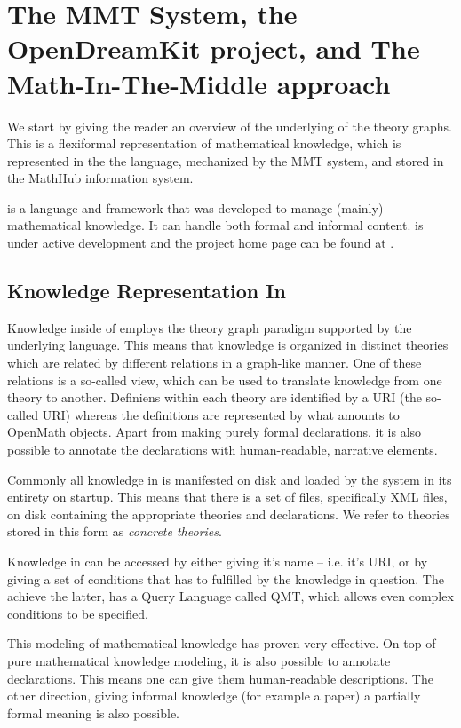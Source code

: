 \section{The MMT System, the OpenDreamKit project, and The Math-In-The-Middle approach}\label{sec:mmtmitm}

We start by giving the reader an overview of the underlying of the \ommt theory graphs. 
This is a flexiformal representation of mathematical knowledge, which is represented in the the \omdocmmt language, mechanized by the MMT system, and stored in the MathHub information system. 

\mmt \cite{Rabe:MMTLanguageSystem09} is a language and framework that was developed to manage (mainly) mathematical knowledge. 
It can handle both formal and informal content. 
\mmt is under active development and the project home page can be found at \cite{uniformal:on}. 

\subsection{Knowledge Representation In \omdocmmt}\label{sec:mmtmitm:kr}

Knowledge inside of \mmt employs the theory graph paradigm supported by the underlying \ommt language. 
This means that knowledge is organized in distinct theories which are related by different relations in a graph-like manner. 
One of these relations is a so-called view, which can be used to translate knowledge from one theory to another. 
Definiens within each theory are identified by a URI (the so-called \mmt URI) whereas the definitions are represented by what amounts to OpenMath \cite{BusCapCar:oms04} objects. 
Apart from making purely formal declarations, it is also possible to annotate the declarations with human-readable, narrative elements. 

Commonly all knowledge in \mmt is manifested on disk and loaded by the system in its entirety on startup. 
This means that there is a set of files, specifically XML files, on disk containing the appropriate theories and declarations. 
We refer to theories stored in this form as \textit{concrete theories}. 

Knowledge in \mmt can be accessed by either giving it's name -- i.e. it's \mmt URI, 
or by giving a set of conditions that has to fulfilled by the knowledge in question. 
The achieve the latter, \mmt has a Query Language called QMT, which allows even complex conditions to be specified. 

This modeling of mathematical knowledge has proven very effective. 
On top of pure mathematical knowledge modeling, it is also possible to annotate declarations. 
This means one can give them human-readable descriptions.
The other direction, giving informal knowledge (for example a paper) a partially formal meaning is also possible.

